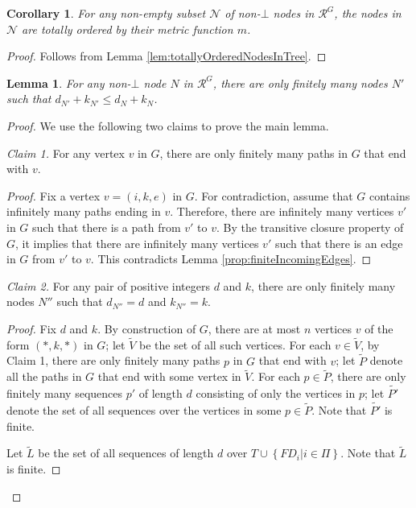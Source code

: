 \documentclass[11pt]{article}
\numberwithin{theorem}{section}
\newtheorem{lemma}[theorem]{Lemma}
\newtheorem{corollary}[theorem]{Corollary}
\newcommand{\set}[1]{\left\{#1\right\}}
\begin{document}
\begin{corollary}\label{cor:totallyOrderedNodesInSubset}
For any non-empty subset $\mathcal{N}$ of non-$\bot$ nodes in $\mathcal{R}^G$, the nodes in $\mathcal{N}$ are totally ordered by their metric function $m$.
\end{corollary}
\begin{proof}
Follows from Lemma \ref{lem:totallyOrderedNodesInTree}.
\end{proof}

\begin{lemma}\label{lem:OnlyFinitelyManyNodesWithDPlusK}
For any non-$\bot$ node $N$ in $\mathcal{R}^G$, there are only finitely many nodes $N'$ such that $d_{N'} + k_{N'} \leq d_{N} + k_{N}$.
\end{lemma}
\begin{proof}
We use the following two claims to prove the main lemma.

\emph{Claim 1.} For any vertex $v$ in $G$, there are only finitely many paths in $G$ that end with $v$.
\begin{proof}
Fix a vertex $v = (i,k,e)$ in $G$. 
For contradiction, assume that $G$ contains infinitely many paths ending in $v$.
Therefore, there are infinitely many vertices $v'$ in $G$ such that there is a path from $v'$ to $v$.
By the transitive closure property of $G$, it implies that there are infinitely many vertices $v'$ such that there is an edge in $G$ from $v'$ to $v$.
This contradicts Lemma \ref{prop:finiteIncomingEdges}.
\end{proof}

\emph{Claim 2.} For any pair of positive integers $d$ and $k$, there are only finitely many nodes $N''$ such that $d_{N''} = d$ and $k_{N''} = k$.
\begin{proof}
Fix $d$ and $k$. By construction of $G$, there are at most $n$ vertices $v$ of the form $(*,k,*)$ in $G$; let $\tilde{V}$ be the set of all such vertices. For each $v \in \tilde{V}$, by Claim 1, there are only finitely many paths $p$ in $G$ that end with $v$; let $\tilde{P}$ denote all the paths in $G$ that end with some vertex in $\tilde{V}$. For each $p \in \tilde{P}$, there are only finitely many sequences $p'$ of length $d$ consisting of only the vertices in $p$; let $\tilde{P'}$ denote the set of all sequences over the vertices in some $p \in \tilde{P}$. Note that $\tilde{P'}$ is finite.

Let $\tilde{L}$ be the set of all sequences of length $d$ over $T \cup \set{FD_i | i \in \Pi}$. Note that $\tilde{L}$ is finite.


\end{proof}
\end{proof}
\end{document}
